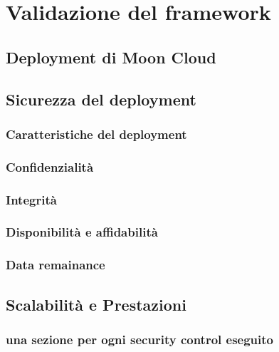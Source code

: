 \documentclass[../main.tex]{subfiles}
\begin{document}
\chapter{Validazione del framework}
\section{Deployment di Moon Cloud}
\section{Sicurezza del deployment}
\subsection{Caratteristiche del deployment}
\subsection{Confidenzialità}
\subsection{Integrità}
\subsection{Disponibilità e affidabilità}
\subsection{Data remainance}
\section{Scalabilità e Prestazioni}
\subsection{una sezione per ogni security control eseguito}
\end{document}
